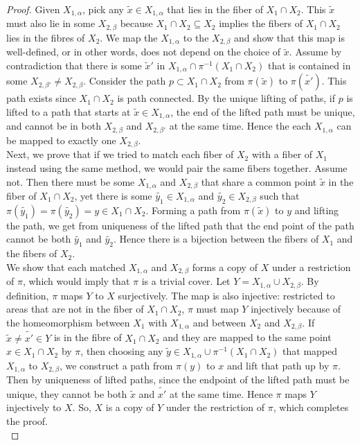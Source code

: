\documentclass{article}
\begin{document}
\begin{enumerate}
\begin{proof}
      Given $X_{1,\alpha}$, pick any $\tilde{x}\in X_{1,\alpha}$ that lies
      in the fiber of $X_1\cap X_2$.  This $\tilde{x}$ must also lie in
      some $X_{2,\beta}$ because $X_1\cap X_2\subseteq X_2$ implies the
      fibers of $X_1\cap X_2$ lies in the fibres of $X_2$. We map the
      $X_{1,\alpha}$ to the $X_{2,\beta}$ and show that this map is
      well-defined, or in other words, does not depend on the choice of
      $\tilde{x}$. Assume by contradiction that there is some $\tilde{x}'$
      in $X_{1,\alpha}\cap\pi^{-1}(X_1\cap X_2)$ that is contained in some
      $X_{2,\beta'}\neq X_{2,\beta}$. Consider the path $p\subset X_1\cap
      X_2$ from $\pi(\tilde{x})$ to $\pi(\tilde{x'})$. This path exists
      since $X_1\cap X_2$ is path connected. By the unique lifting of
      paths, if $p$ is lifted to a path that starts at $\tilde{x}\in
      X_{1,\alpha}$, the end of the lifted path must be unique, and cannot
      be in both $X_{2,\beta}$ and $X_{2,\beta'}$ at the same time. Hence
      the each $X_{1,\alpha}$ can be mapped to exactly one $X_{2,\beta}$.
      \\

      Next, we prove that if we tried to match each fiber of $X_2$ with a
      fiber of $X_1$ instead using the same method, we would pair the same
      fibers together. Assume not. Then there must be some $X_{1,\alpha}$
      and $X_{2,\beta}$ that share a common point $\tilde{x}$ in the fiber
      of $X_1\cap X_2$, yet there is some $\tilde{y_1}\in X_{1,\alpha}$ and
      $\tilde{y_2}\in X_{2,\beta}$ such that
      $\pi(\tilde{y_1})=\pi(\tilde{y_2})=y\in X_1\cap X_2$. Forming a path
      from $\pi(\tilde{x})$ to $y$ and lifting the path, we get from
      uniqueness of the lifted path that the end point of the path cannot
      be both $\tilde{y_1}$ and $\tilde{y_2}$. Hence there is a bijection
      between the fibers of $X_1$ and the fibers of $X_2$. \\

      We show that each matched $X_{1,\alpha}$ and $X_{2,\beta}$ forms a
      copy of $X$ under a restriction of $\pi$, which would imply
      that $\pi$ is a trivial cover. Let $Y=X_{1,\alpha}\cup X_{2,\beta}$.
      By definition, $\pi$ maps $Y$ to $X$ surjectively. The map is also
      injective: restricted to areas that are not in the fiber of $X_1\cap
      X_2$, $\pi$ must map $Y$ injectively because of the homeomorphism
      between $X_1$ with $X_{1,\alpha}$ and between $X_2$ and
      $X_{2,\beta}$. If $\tilde{x}\neq\tilde{x'}\in Y$ is in the fibre of
      $X_1\cap X_2$ and they are mapped to the same point $x\in X_1\cap
      X_2$ by $\pi$, then choosing any $\tilde{y}\in
      X_{1,\alpha}\cup\pi^{-1}(X_1\cap X_2)$ that mapped $X_{1,\alpha}$ to
      $X_{2,\beta}$, we construct a path from $\pi(y)$ to $x$ and lift that
      path up by $\pi$. Then by uniqueness of lifted paths, since the
      endpoint of the lifted path must be unique, they cannot be both
      $\tilde{x}$ and $\tilde{x'}$ at the same time. Hence $\pi$ maps $Y$
      injectively to $X$. So, $X$ is a copy of $Y$ under the restriction of
      $\pi$, which completes the proof. \\
    \end{proof}


\end{enumerate}
\end{document}
